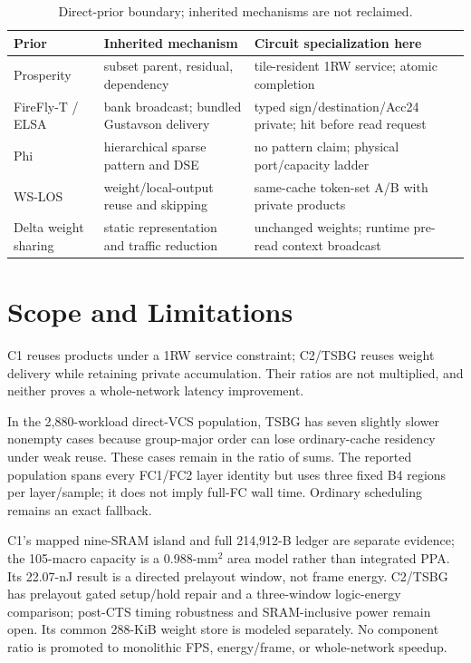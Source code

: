 \documentclass[journal]{IEEEtran}
\begin{document}
\begin{table}[t]
\caption{Direct-prior boundary; inherited mechanisms are not reclaimed.}
\label{tab:prior}
\centering
\scriptsize
\begin{tabular}{@{}L{0.21\columnwidth}L{0.30\columnwidth}L{0.38\columnwidth}@{}}
\toprule
Prior & Inherited mechanism & Circuit specialization here \\
\midrule
Prosperity & subset parent, residual, dependency & tile-resident 1RW service; atomic completion \\
FireFly-T / ELSA & bank broadcast; bundled Gustavson delivery & typed sign/destination/Acc24 private; hit before read request \\
Phi & hierarchical sparse pattern and DSE & no pattern claim; physical port/capacity ladder \\
WS-LOS & weight/local-output reuse and skipping & same-cache token-set A/B with private products \\
Delta weight sharing & static representation and traffic reduction & unchanged weights; runtime pre-read context broadcast \\
\bottomrule
\end{tabular}
\end{table}

\section{Scope and Limitations}
C1 reuses products under a 1RW service constraint; C2/TSBG reuses weight
delivery while retaining private accumulation.  Their ratios are not
multiplied, and neither proves a whole-network latency improvement.

In the 2,880-workload direct-VCS population, TSBG has seven slightly slower
nonempty cases because group-major order can
lose ordinary-cache residency under weak reuse.  These cases remain in the
ratio of sums.  The reported population spans every FC1/FC2 layer identity but
uses three fixed B4 regions per layer/sample; it does not imply full-FC wall
time.  Ordinary scheduling remains an exact fallback.

C1's mapped nine-SRAM island and full 214,912-B ledger are separate evidence;
the 105-macro capacity is a 0.988-mm$^2$ area model rather than integrated PPA.
Its 22.07-nJ result is a directed prelayout window, not frame energy.  C2/TSBG
has prelayout gated setup/hold repair and a three-window logic-energy
comparison; post-CTS timing robustness and SRAM-inclusive power remain open.
Its common 288-KiB weight store is modeled separately.  No component ratio is promoted to
monolithic FPS, energy/frame, or whole-network speedup.
\end{document}
